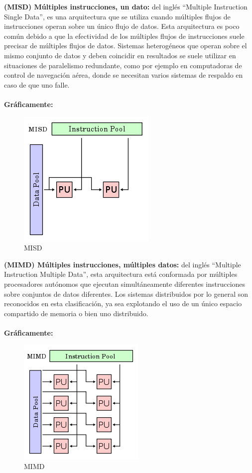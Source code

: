 \textbf{\newline (MISD) Múltiples instrucciones, un dato:} del inglés ``Multiple Instruction Single Data'', es una arquitectura que se utiliza cuando múltiples flujos de \linebreak instrucciones operan sobre un único flujo de datos. Esta arquitectura es poco común debido a que la efectividad de los múltiples flujos de instrucciones suele precisar de múltiples flujos de datos. Sistemas heterogéneos que operan sobre el mismo conjunto de datos y deben coincidir en resultados se suele utilizar en situaciones de paralelismo redundante, como por ejemplo en computadoras de control de navegación aérea, donde se necesitan varios sistemas de respaldo en caso de que uno falle.\\
\newpage 
\textbf{\\Gráficamente:}
\begin{figure}[H]
\begin{center}
\includegraphics[scale=0.7]{images/MISD.png}
\caption{MISD}
\label{fig:MISD}
\end{center}
\end{figure} 

\textbf{\newline (MIMD) Múltiples instrucciones, múltiples datos:} del inglés ``Multiple Instruction Multiple Data'', esta arquitectura está conformada por múltiples procesadores autónomos que ejecutan simultáneamente diferentes instrucciones sobre conjuntos de datos diferentes. Los sistemas distribuidos por lo general son reconocidos en esta clasificación, ya sea explotando el uso de un único espacio compartido de memoria o bien uno distribuido.\\
\textbf{\\Gráficamente:}
\begin{figure}[H]
\begin{center}
\includegraphics[scale=0.7]{images/MIMD.png}
\caption{MIMD}
\label{fig:MIMD}
\end{center}
\end{figure} 

